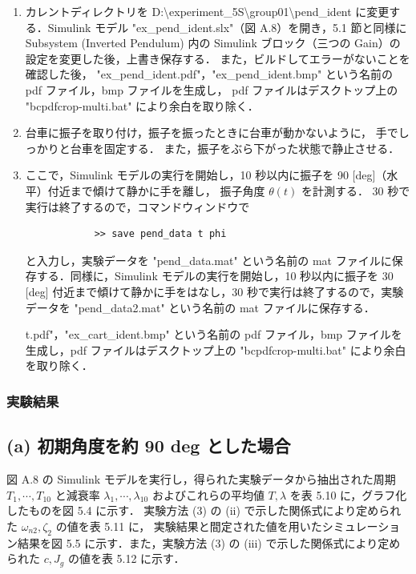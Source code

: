 \begin{enumerate}
  \item カレントディレクトリを D:\textbackslash experiment\_5S\textbackslash group01\textbackslash pend\_ident に変更する．Simulink モデル "ex\_pend\_ident.slx"（図 A.8）を開き，5.1 節と同様に Subsystem (Inverted Pendulum) 内の Simulink ブロック（三つの Gain）の設定を変更した後，上書き保存する．
        また，ビルドしてエラーがないことを確認した後，
        "ex\_pend\_ident.pdf"，"ex\_pend\_ident.bmp" 
        という名前の pdf ファイル，bmp ファイルを生成し，
        pdf ファイルはデスクトップ上の "bcpdfcrop-multi.bat" 
        により余白を取り除く．
        
  \item 台車に振子を取り付け，振子を振ったときに台車が動かないように，
        手でしっかりと台車を固定する．
        また，振子をぶら下がった状態で静止させる．
        
  \item ここで，Simulink モデルの実行を開始し，10 秒以内に振子を 90 [deg]（水平）付近まで傾けて静かに手を離し，
        振子角度 \( \theta(t) \) を計測する．
        30 秒で実行は終了するので，コマンドウィンドウで
        \begin{tcolorbox}[colback=gray!5!white,colframe=gray!75!black]
          \begin{lstlisting}
            >> save pend_data t phi
            \end{lstlisting}
        \end{tcolorbox}
        と入力し，実験データを "pend\_data.mat" という名前の mat ファイルに保存する．同様に，Simulink モデルの実行を開始し，10 秒以内に振子を 30 [deg] 付近まで傾けて静かに手をはなし，30 秒で実行は終了するので，実験データを "pend\_data2.mat" という名前の mat ファイルに保存する．
        
        t.pdf"，"ex\_cart\_ident.bmp" という名前の pdf ファイル，bmp ファイルを生成し，pdf ファイルはデスクトップ上の "bcpdfcrop-multi.bat" により余白を取り除く．
\end{enumerate}

\subsubsection{実験結果}
\subsection*{(a) 初期角度を約 90 deg とした場合}

図 A.8 の Simulink モデルを実行し，得られた実験データから抽出された周期 
\( T_1, \cdots, T_{10} \) と減衰率 \( \lambda_1, \cdots, \lambda_{10} \) 
およびこれらの平均値 \( T, \lambda \) を表 5.10 に，グラフ化したものを図 5.4 に示す．
実験方法 (3) の (ii) で示した関係式により定められた \( \omega_{n2}, \zeta_2 \) の値を表 5.11 に，
実験結果と間定された値を用いたシミュレーション結果を図 5.5 に示す．また，実験方法 (3) の (iii) 
で示した関係式により定められた \( c, J_g \) の値を表 5.12 に示す．

